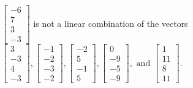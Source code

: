 \begin{exercise}
\begin{exerciseStatement}
  \end{exerciseStatement}
  \begin{exerciseAnswer}
   \(\left[\begin{array}{c}
-6 \\
7 \\
3 \\
-3
\end{array}\right]\) 
  	 is not  
	a linear combination of the vectors \(\left[\begin{array}{c}
3 \\
-3 \\
4 \\
-3
\end{array}\right] , \left[\begin{array}{c}
-1 \\
-2 \\
-3 \\
-2
\end{array}\right] , \left[\begin{array}{c}
-2 \\
5 \\
-1 \\
5
\end{array}\right] , \left[\begin{array}{c}
0 \\
-9 \\
-5 \\
-9
\end{array}\right] , \text{ and } \left[\begin{array}{c}
1 \\
11 \\
8 \\
11
\end{array}\right]\).

	
  


  \end{exerciseAnswer}
\end{exercise}